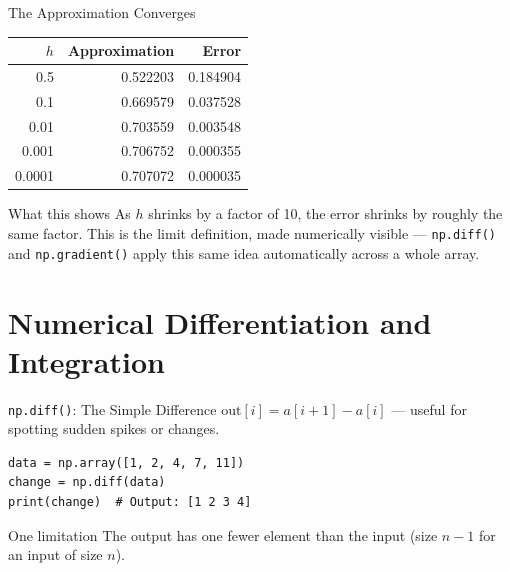 \documentclass[9pt,aspectratio=169,xcolor=table]{beamer}
\begin{document}
\begin{frame}{The Approximation Converges}
    \leavevmode
    \small
    \begin{center}
    \begin{tabular}{@{}rrr@{}}
        \toprule
        $h$ & Approximation & Error \\
        \midrule
        0.5    & 0.522203 & 0.184904 \\
        0.1    & 0.669579 & 0.037528 \\
        0.01   & 0.703559 & 0.003548 \\
        0.001  & 0.706752 & 0.000355 \\
        0.0001 & 0.707072 & 0.000035 \\
        \bottomrule
    \end{tabular}
    \end{center}

    \vspace{3mm}
    \begin{block}{What this shows}
        As $h$ shrinks by a factor of 10, the error shrinks by roughly
        the same factor. This \alert{is} the limit definition, made
        numerically visible --- \texttt{np.diff()} and
        \texttt{np.gradient()} apply this same idea automatically
        across a whole array.
    \end{block}
\end{frame}

\section{Numerical Differentiation and Integration}

\begin{frame}[fragile]{\texttt{np.diff()}: The Simple Difference}
    \leavevmode
    $\text{out}[i] = a[i+1] - a[i]$ --- useful for spotting sudden
    spikes or changes.

\begin{lstlisting}
data = np.array([1, 2, 4, 7, 11])
change = np.diff(data)
print(change)  # Output: [1 2 3 4]
\end{lstlisting}

    \vspace{2mm}
    \begin{alertblock}{One limitation}
        The output has \alert{one fewer element} than the input (size
        $n-1$ for an input of size $n$).
    \end{alertblock}
\end{frame}
\end{document}
